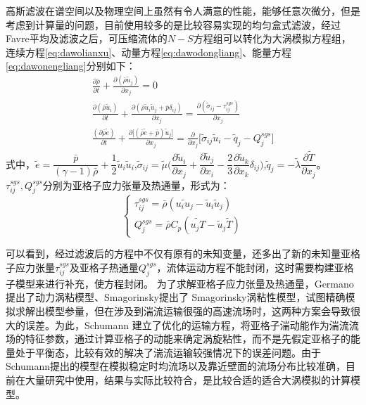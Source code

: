 高斯滤波在谱空间以及物理空间上虽然有令人满意的性能，能够任意次微分，但是考虑到计算量的问题，目前使用较多的是比较容易实现的均匀盒式滤波，经过Favre平均及滤波之后，可压缩流体的$N-S$方程组可以转化为大涡模拟方程组\cite{thomas2006}，连续方程\eqref{eq:dawolianxu}、动量方程\eqref{eq:dawodongliang}、能量方程\eqref{eq:dawonengliang}分别如下：
\begin{gather}
\frac{\partial\bar{\rho}}{\partial t}+\frac{\partial(\bar{\rho}\tilde{u}_j)}{\partial x_j}=0
\label{eq:dawolianxu}\\
\frac{\partial(\bar{\rho}\tilde{u}_i)}{\partial t}+\frac{\partial(\bar{\rho}\tilde{u}_i\tilde{u}_j+\bar{p}\delta_{ij})}{\partial x_j}=\frac{\partial(\tilde{\sigma}_{ij}-\tau^{sgs}_{ij})}{\partial x_j}
\label{eq:dawodongliang}\\
\frac{(\partial\bar{\rho}\tilde{e})}{\partial t}+\frac{\partial\big[(\bar{\rho}\tilde{e}+\bar{p})\tilde{u}_j\big]}{\partial x_j}=\frac{\partial}{\partial x_j}\big[\tilde{\sigma}_{ij}\tilde{u}_i-\tilde{q}_j-Q_{j}^{sgs}\big]
\label{eq:dawonengliang}
\end{gather}
式中，$\tilde{e}=\dfrac{\bar{p}}{(\gamma-1)\bar{\rho}}+\dfrac{1}{2}\tilde{u}_i\tilde{u}_i$,$\tilde{\sigma}_{ij}=\tilde{\mu}\Big(\dfrac{\partial\tilde{u}_i}{\partial x_j}+\dfrac{\partial\tilde{u}_j}{\partial x_i}-\dfrac{2}{3}\dfrac{\partial\tilde{u}_k}{\partial x_k}\delta_{ij}\Big)$,$\tilde{q}_j=-\tilde{\lambda}\dfrac{\partial\tilde{T}}{\partial x_j}$。$\tau_{ij}^{sgs},Q_{j}^{sgs}$分别为亚格子应力张量及热通量，形式为：
\begin{equation}
\begin{cases}
\tau_{ij}^{sgs}=\bar{\rho}(\widetilde{u_iu_j}-\tilde{u}_i\tilde{u}_j)\\
Q_j^{sgs}=\bar{\rho}C_p(\widetilde{u_jT}-\tilde{u}_j\tilde{T})
\end{cases}
\end{equation}

可以看到，经过滤波后的方程中不仅有原有的未知变量，还多出了新的未知量亚格子应力张量$\tau_{ij}^{sgs}$及亚格子热通量$Q_{j}^{sgs}$，流体运动方程不能封闭，这时需要构建亚格子模型来进行补充，使方程封闭。
为了求解亚格子应力张量及热通量，Germano提出了动力涡粘模型、Smagorinsky提出了 Smagorinsky涡粘性模型，试图精确模拟求解出模型参量，但在涉及到湍流运输很强的高速流场时，这两种方案会导致很大的误差。为此，Schumann 建立了优化的运输方程，将亚格子湍动能作为湍流流场的特征参数，通过计算亚格子的动能来确定涡旋粘性，而不是先假定亚格子的能量处于平衡态，比较有效的解决了湍流运输较强情况下的误差问题\cite{schumann1975}。由于Schumann提出的模型在模拟稳定时均流场以及靠近壁面的流场分布比较准确，目前在大量研究中使用，结果与实际比较符合，是比较合适的适合大涡模拟的计算模型。

